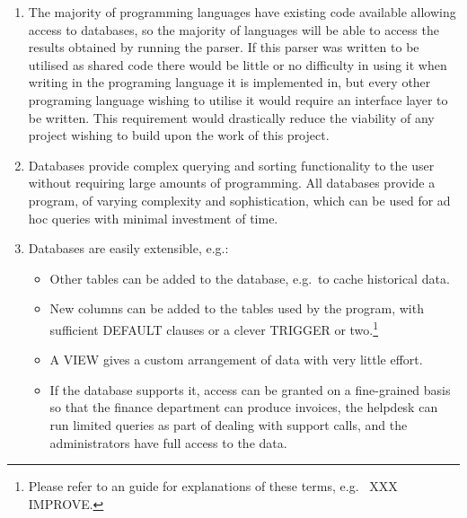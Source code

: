 \documentclass[a4paper,12pt,draft]{article}
\begin{document}
\begin{enumerate}

    \item The majority of programming languages have existing code
        available allowing access to databases, so the majority of
        languages will be able to access the results obtained by running
        the parser.  If this parser was written to be utilised as shared
        code there would be little or no difficulty in using it when
        writing in the programing language it is implemented in, but every
        other programing language wishing to utilise it would require an
        interface layer to be written.  This requirement would drastically
        reduce the viability of any project wishing to build upon the work
        of this project.

    \item Databases provide complex querying and sorting functionality to
        the user without requiring large amounts of programming.  All
        databases provide a program, of varying complexity and
        sophistication, which can be used for ad hoc queries with minimal
        investment of time.

    \item Databases are easily extensible, e.g.:

        \begin{itemize}

            \item Other tables can be added to the database, e.g.\ to cache
                historical data.

            \item New columns can be added to the tables used by the
                program, with sufficient DEFAULT clauses or a clever
                TRIGGER or two.\footnote{Please refer to an \SQL{} guide
                for explanations of these terms, e.g.~\cite{wikipedia-sql}
                XXX IMPROVE.}

            \item A VIEW gives a custom arrangement of data with very
                little effort.

            \item If the database supports it, access can be granted on a
                fine-grained basis so that the finance department can
                produce invoices, the helpdesk can run limited queries as
                part of dealing with support calls, and the administrators
                have full access to the data.


\end{itemize}
\end{enumerate}
\end{document}
